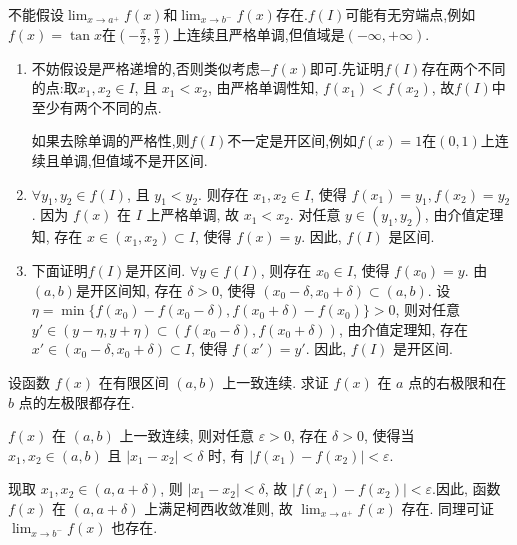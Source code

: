 \begin{solution}
    \begin{remark}
        不能假设$\lim_{x \to a^+} f(x)$和$\lim_{x \to b^-} f(x)$存在.$f(I)$可能有无穷端点,例如$f(x)=\tan x$在$(-\frac{\pi}{2}, \frac{\pi}{2})$上连续且严格单调,但值域是$(-\infty,+\infty)$.
    \end{remark}
    \begin{enumerate}
        \item 不妨假设是严格递增的,否则类似考虑$-f(x)$即可.先证明$f(I)$存在两个不同的点:取$x_1, x_2 \in I$, 且 $x_1 < x_2$, 由严格单调性知, $f(x_1) < f(x_2)$, 故$f(I)$中至少有两个不同的点.

              \begin{remark}
                  如果去除单调的严格性,则$f(I)$不一定是开区间,例如$f(x)=1$在$(0,1)$上连续且单调,但值域不是开区间.
              \end{remark}
        \item $\forall y_1, y_2 \in f(I)$, 且 $y_1 < y_2$. 则存在 $x_1, x_2 \in I$, 使得 $f(x_1) = y_1, f(x_2) = y_2$. 因为 $f(x)$ 在 $I$ 上严格单调, 故 $x_1 < x_2$. 对任意 $y \in (y_1, y_2)$, 由介值定理知, 存在 $x \in (x_1, x_2) \subset I$, 使得 $f(x) = y$. 因此, $f(I)$ 是区间.
        \item 下面证明$f(I)$是开区间. $\forall y \in f(I)$, 则存在 $x_0 \in I$, 使得 $f(x_0) = y$. 由$(a,b)$是开区间知, 存在 $\delta > 0$, 使得 $(x_0 - \delta, x_0 + \delta) \subset (a,b)$. 设 $\eta = \min\{f(x_0) - f(x_0 - \delta), f(x_0 + \delta) - f(x_0)\} > 0$, 则对任意 $y' \in (y - \eta, y + \eta)\subset (f(x_0 - \delta), f(x_0 + \delta))$, 由介值定理知, 存在 $x' \in (x_0 - \delta, x_0 + \delta) \subset I$, 使得 $f(x') = y'$. 因此, $f(I)$ 是开区间.
    \end{enumerate}
\end{solution}

\begin{exercise}[2.2.13]
    设函数 $f(x)$ 在有限区间 $(a,b)$ 上一致连续. 求证 $f(x)$ 在 $a$ 点的右极限和在 $b$ 点的左极限都存在.
\end{exercise}

\begin{solution}
    $f(x)$ 在 $(a,b)$ 上一致连续, 则对任意 $\varepsilon > 0$, 存在 $\delta > 0$, 使得当 $x_1, x_2 \in (a,b)$ 且 $|x_1 - x_2| < \delta$ 时, 有 $|f(x_1) - f(x_2)| < \varepsilon$. 

    现取 $x_1, x_2 \in (a, a+\delta)$, 则 $|x_1 - x_2| < \delta$, 故 $|f(x_1) - f(x_2)| < \varepsilon$.因此, 函数 $f(x)$ 在 $(a, a+\delta)$ 上满足柯西收敛准则, 故 $\lim_{x \to a^+} f(x)$ 存在. 同理可证 $\lim_{x \to b^-} f(x)$ 也存在.
\end{solution}

